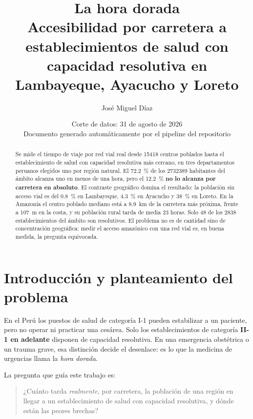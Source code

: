 \documentclass[11pt,a4paper]{article}
\title{\textbf{La hora dorada}\\[0.3em]
\large Accesibilidad por carretera a establecimientos de salud con capacidad
resolutiva en Lambayeque, Ayacucho y Loreto}
\author{José Miguel Díaz}
\date{Corte de datos: 31 de agosto de 2026 \\ \small Documento generado automáticamente
por el pipeline del repositorio}
\begin{document}
\maketitle

\begin{abstract}
\noindent
Se mide el tiempo de viaje por red vial real desde \num{15418} centros poblados hasta el
establecimiento de salud con capacidad resolutiva más cercano, en tres departamentos
peruanos elegidos uno por región natural. El \SI{72.2}{\percent} de los
\num{2732389} habitantes del ámbito alcanza uno en menos de una hora, pero el
\SI{12.2}{\percent} \textbf{no lo alcanza por carretera en absoluto}. El contraste
geográfico domina el resultado: la población sin acceso vial es del
\SI{0.8}{\percent} en Lambayeque, \SI{4.3}{\percent} en Ayacucho y
\SI{38}{\percent} en Loreto. En la Amazonía el centro poblado mediano está a
\SI{8.9}{\kilo\meter} de la carretera más próxima, frente a \SI{107}{\meter} en la costa,
y su población rural tarda de media \num{23} horas. Solo \num{48} de los \num{2838}
establecimientos del ámbito son resolutivos. El problema no es de cantidad sino de
concentración geográfica: medir el acceso amazónico con una red vial es, en buena medida,
la pregunta equivocada.
\end{abstract}

\section{Introducción y planteamiento del problema}

En el Perú los puestos de salud de categoría I-1 pueden estabilizar a un paciente, pero no
operar ni practicar una cesárea. Solo los establecimientos de categoría \textbf{II-1 en
adelante} disponen de capacidad resolutiva. En una emergencia obstétrica o un trauma grave,
esa distinción decide el desenlace: es lo que la medicina de urgencias llama la
\emph{hora dorada}.

La pregunta que guía este trabajo es:

\begin{quote}
¿Cuánto tarda \emph{realmente}, por carretera, la población de una región en llegar a un
establecimiento de salud con capacidad resolutiva, y dónde están las peores brechas?
\end{quote}
\end{document}
